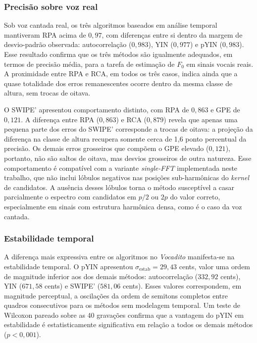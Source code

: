   \subsubsection{Precisão sobre voz real}

  Sob voz cantada real, os três algoritmos baseados em análise temporal
  mantiveram RPA acima de $0{,}97$, com diferenças entre si dentro da margem de
  desvio-padrão observada: autocorrelação ($0{,}983$), YIN ($0{,}977$) e pYIN
  ($0{,}983$). Esse resultado confirma que os três métodos são igualmente
  adequados, em termos de precisão média, para a tarefa de estimação de $F_0$
  em sinais vocais reais. A proximidade entre RPA e RCA, em todos os três
  casos, indica ainda que a quase totalidade dos erros remanescentes ocorre
  dentro da mesma classe de altura, sem trocas de oitava.

  O SWIPE' apresentou comportamento distinto, com RPA de $0{,}863$ e GPE de
  $0{,}121$. A diferença entre RPA ($0{,}863$) e RCA ($0{,}879$) revela que
  apenas uma pequena parte dos erros do SWIPE' corresponde a trocas de oitava: a
  projeção da diferença na classe de altura recupera somente cerca de 1{,}6
  ponto percentual da precisão. Os demais erros grosseiros que compõem o GPE
  elevado ($0{,}121$), portanto, não são saltos de oitava, mas desvios
  grosseiros de outra natureza.
  Esse comportamento é compatível com a variante \textit{single-FFT}
  implementada neste trabalho, que não inclui lóbulos negativos nas posições
  sub-harmônicas do \textit{kernel} de candidatos. A ausência desses lóbulos
  torna o método susceptível a casar parcialmente o espectro com candidatos em
  $p/2$ ou $2p$ do valor correto, especialmente em sinais com estrutura
  harmônica densa, como é o caso da voz cantada.

  \subsubsection{Estabilidade temporal}

  A diferença mais expressiva entre os algoritmos no \textit{Vocadito}
  manifesta-se na estabilidade temporal. O pYIN apresentou
  $\sigma_{\text{estab}} = 29{,}43$ cents, valor uma ordem de magnitude
  inferior aos dos demais métodos: autocorrelação ($332{,}92$ cents), YIN
  ($671{,}58$ cents) e SWIPE' ($581{,}06$ cents). Esses valores correspondem,
  em magnitude perceptual, a oscilações da ordem de semitons completos entre
  quadros consecutivos para os métodos sem modelagem temporal. Um teste de Wilcoxon pareado sobre as 40 gravações confirma que a vantagem do pYIN em estabilidade é estatisticamente significativa em relação a todos os demais métodos ($p < 0{,}001$).

